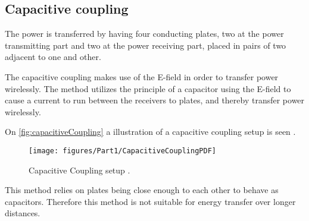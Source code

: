 \subsection{Capacitive coupling}\label{sec:capacitiveCoupling}
The power is transferred by having four conducting plates, two at the power transmitting part and two at the power receiving part, placed in pairs of two adjacent to one and other.

The capacitive coupling makes use of the E-field in order to transfer power wirelessly. The method utilizes the principle of a capacitor using the E-field to cause a current to run between the receivers to plates, and thereby transfer power wirelessly.

On \autoref{fig:capacitiveCoupling} a illustration of a capacitive coupling setup is seen \citep{sci_article:capacitively_coupled_power_transfer}.
\begin{figure}[h]
	\centering
	\texttt{[image: figures/Part1/CapacitiveCouplingPDF]}
	\caption{Capacitive Coupling setup \citep{website:capacitive_bipolar}.}
	\label{fig:capacitiveCoupling}
\end{figure}

This method relies on plates being close enough to each other to behave as capacitors. Therefore this method is not suitable for energy transfer over longer distances.

